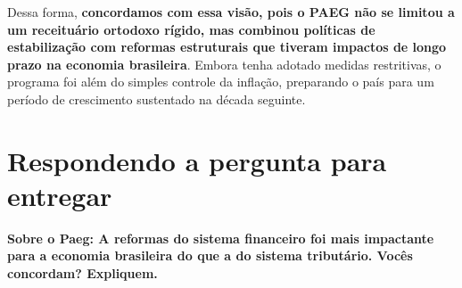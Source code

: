\documentclass[a4paper,12pt]{article}[abntex2]
\begin{document}
\noindent Dessa forma, \textbf{concordamos com essa visão, pois o PAEG não se limitou a um receituário ortodoxo rígido, mas combinou políticas de estabilização com reformas estruturais que tiveram impactos de longo prazo na economia brasileira}. Embora tenha adotado medidas restritivas, o programa foi além do simples controle da inflação, preparando o país para um período de crescimento sustentado na década seguinte.

\newpage
\section{\textbf{Respondendo a pergunta para entregar}}

\textbf{Sobre o Paeg: A reformas do sistema financeiro foi mais impactante para a economia brasileira do que a do sistema tributário. Vocês concordam? Expliquem.}
\end{document}
